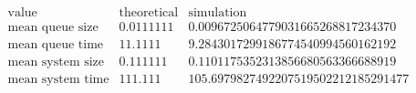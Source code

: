 \[\begin{array}{cccc}
 \text{value} & \text{theoretical} & \text{simulation} & \text{} \\
 \text{mean queue size} & 0.0111111 & 0.0096725064779031665268817234370 & \text{} \\
 \text{mean queue time} & 11.1111 & 9.2843017299186774540994560162192 & \text{} \\
 \text{mean system size} & 0.111111 & 0.1101175352313856680563366688919 & \text{} \\
 \text{mean system time} & 111.111 & 105.6979827492207519502212185291477 & \text{} \\
\end{array}\]

